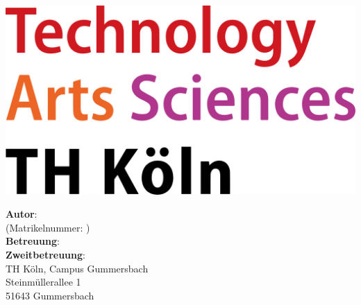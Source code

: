\makeatletter
\begin{titlepage}
    \begin{flushleft}
            \includegraphics[width=0.25\linewidth]{Figures/TH_Koeln_Logo.svg.png}
    \end{flushleft}
    \begin{center}
        \vspace*{1cm}

        \Large
        \textbf{\@title}

        \vspace{1.5cm}
        
        \thesistype{}
        
        \vspace{1cm}
        \vspace{1cm}

        \large
        \textbf{Autor}: \thesisauthor{}\\
        \large
        (Matrikelnummer: \studentID{})\\
        \large
        \textbf{Betreuung}: \supervisor{}\\
        \large
        \textbf{Zweitbetreuung}: \cosupervisor{}\\


        \vspace{1cm}
        \large
        TH Köln, Campus Gummersbach\\
        Steinmüllerallee 1\\
        51643 Gummersbach\\

        \vspace{1cm}
        \@date

    \end{center}
\end{titlepage}
\makeatother